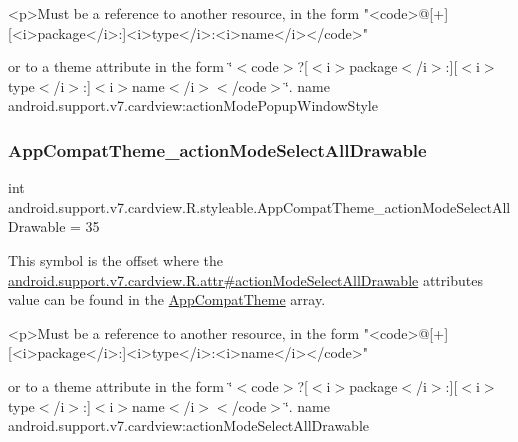 \begin{DoxyVerb}      <p>Must be a reference to another resource, in the form "<code>@[+][<i>package</i>:]<i>type</i>:<i>name</i></code>"
\end{DoxyVerb}
 or to a theme attribute in the form \char`\"{}$<$code$>$?\mbox{[}$<$i$>$package$<$/i$>$\+:\mbox{]}\mbox{[}$<$i$>$type$<$/i$>$\+:\mbox{]}$<$i$>$name$<$/i$>$$<$/code$>$\char`\"{}.  name android.\+support.\+v7.\+cardview\+:action\+Mode\+Popup\+Window\+Style \mbox{\label{classandroid_1_1support_1_1v7_1_1cardview_1_1R_1_1styleable_ab0297c0ea60fe49a756d7ab2b43f0378}} 
\subsubsection{\texorpdfstring{App\+Compat\+Theme\+\_\+action\+Mode\+Select\+All\+Drawable}{AppCompatTheme\_actionModeSelectAllDrawable}}
{\footnotesize\ttfamily int android.\+support.\+v7.\+cardview.\+R.\+styleable.\+App\+Compat\+Theme\+\_\+action\+Mode\+Select\+All\+Drawable = 35\hspace{0.3cm}{\ttfamily [static]}}

This symbol is the offset where the \hyperlink{classandroid_1_1support_1_1v7_1_1cardview_1_1R_1_1attr_a3fe0b7c91a38d7caf797cc0211079d06}{android.\+support.\+v7.\+cardview.\+R.\+attr\#action\+Mode\+Select\+All\+Drawable} attribute\textquotesingle{}s value can be found in the \hyperlink{classandroid_1_1support_1_1v7_1_1cardview_1_1R_1_1styleable_a52e6f69f954ecc2622d72c0b4d298938}{App\+Compat\+Theme} array.

\begin{DoxyVerb}      <p>Must be a reference to another resource, in the form "<code>@[+][<i>package</i>:]<i>type</i>:<i>name</i></code>"
\end{DoxyVerb}
 or to a theme attribute in the form \char`\"{}$<$code$>$?\mbox{[}$<$i$>$package$<$/i$>$\+:\mbox{]}\mbox{[}$<$i$>$type$<$/i$>$\+:\mbox{]}$<$i$>$name$<$/i$>$$<$/code$>$\char`\"{}.  name android.\+support.\+v7.\+cardview\+:action\+Mode\+Select\+All\+Drawable \mbox{\label{classandroid_1_1support_1_1v7_1_1cardview_1_1R_1_1styleable_acdce974dcac87ee093ecef92f712b8dc}} 

